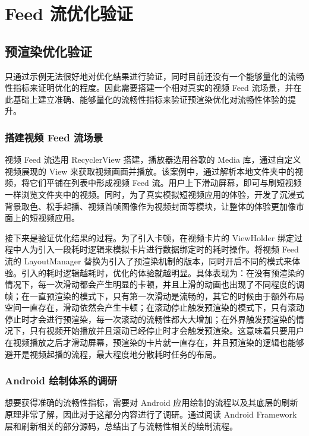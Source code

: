 \chapter{Feed 流优化验证}

\section{预渲染优化验证}

只通过示例无法很好地对优化结果进行验证，同时目前还没有一个能够量化的流畅性指标来证明优化的程度。因此需要搭建一个相对真实的视频 Feed 流场景，并在此基础上建立准确、能够量化的流畅性指标来验证预渲染优化对流畅性体验的提升。

\subsection{搭建视频 Feed 流场景}

视频 Feed 流选用 RecyclerView 搭建，播放器选用谷歌的 Media 库，通过自定义视频展现的 View 来获取视频画面并播放。该案例中，通过解析本地文件夹中的视频，将它们平铺在列表中形成视频 Feed 流。用户上下滑动屏幕，即可与刷短视频一样浏览文件夹中的视频。同时，为了真实模拟短视频应用的体验，开发了沉浸式背景取色、松手起播、视频首帧图像作为视频封面等模块，让整体的体验更加像市面上的短视频应用。

接下来是验证优化结果的过程。为了引入卡顿，在视频卡片的 ViewHolder 绑定过程中人为引入一段耗时逻辑来模拟卡片进行数据绑定时的耗时操作。将视频 Feed 流的 LayoutManager 替换为引入了预渲染机制的版本，同时开启不同的模式来体验。引入的耗时逻辑越耗时，优化的体验就越明显。具体表现为：在没有预渲染的情况下，每一次滑动都会产生明显的卡顿，并且上滑的动画也出现了不同程度的调帧；在一直预渲染的模式下，只有第一次滑动是流畅的，其它的时候由于额外布局空间一直存在，滑动依然会产生卡顿；在滚动停止触发预渲染的模式下，只有滚动停止时才会进行预渲染，每一次滚动的流畅性都大大增加；在外界触发预渲染的情况下，只有视频开始播放并且滚动已经停止时才会触发预渲染。这意味着只要用户在视频播放之后才滑动屏幕，预渲染的卡片就一直存在，并且预渲染的逻辑也能够避开是视频起播的流程，最大程度地分散耗时任务的布局。

\subsection{Android 绘制体系的调研}

想要获得准确的流畅性指标，需要对 Android 应用绘制的流程以及其底层的刷新原理非常了解，因此对于这部分内容进行了调研。通过阅读 Android Framework 层和刷新相关的部分源码，总结出了与流畅性相关的绘制流程。


